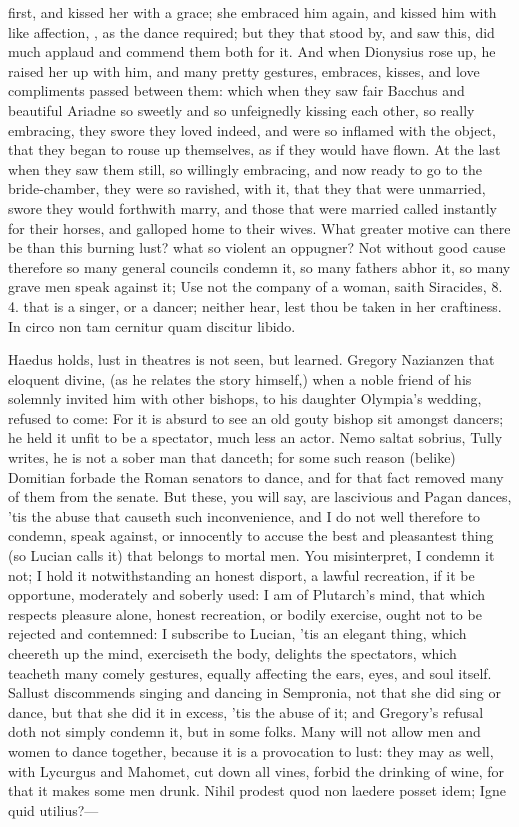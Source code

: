 first, and kissed her with a grace; she embraced him again, and kissed
him with like affection, \etc{}, as the dance required; but they that
stood by, and saw this, did much applaud and commend them both for it.
And when Dionysius rose up, he raised her up with him, and many pretty
gestures, embraces, kisses, and love compliments passed between them:
which when they saw fair Bacchus and beautiful Ariadne so sweetly and
so unfeignedly kissing each other, so really embracing, they swore they
loved indeed, and were so inflamed with the object, that they began to
rouse up themselves, as if they would have flown. At the last when they
saw them still, so willingly embracing, and now ready to go to the
bride-chamber, they were so ravished, with it, that they that were
unmarried, swore they would forthwith marry, and those that were
married called instantly for their horses, and galloped home to their
wives. What greater motive can there be than this burning lust? what so
violent an oppugner? Not without good cause therefore so many general
councils condemn it, so many fathers abhor it, so many grave men speak
against it; Use not the company of a woman, saith Siracides, 8. 4. that
is a singer, or a dancer; neither hear, lest thou be taken in her
craftiness. In circo non tam cernitur quam discitur libido.

Haedus holds, lust in theatres is not seen, but learned. Gregory
Nazianzen that eloquent divine, (as he relates the story
himself,) when a noble friend of his solemnly invited him with other
bishops, to his daughter Olympia's wedding, refused to come: For
it is absurd to see an old gouty bishop sit amongst dancers; he held it
unfit to be a spectator, much less an actor. Nemo saltat sobrius, Tully
writes, he is not a sober man that danceth; for some such reason
(belike) Domitian forbade the Roman senators to dance, and for that
fact removed many of them from the senate. But these, you will say, are
lascivious and Pagan dances, 'tis the abuse that causeth such
inconvenience, and I do not well therefore to condemn, speak against,
or innocently to accuse the best and pleasantest thing (so Lucian
calls it) that belongs to mortal men. You misinterpret, I condemn it
not; I hold it notwithstanding an honest disport, a lawful recreation,
if it be opportune, moderately and soberly used: I am of Plutarch's
mind, that which respects pleasure alone, honest recreation, or
bodily exercise, ought not to be rejected and contemned: I subscribe to
Lucian, 'tis an elegant thing, which cheereth up the mind,
exerciseth the body, delights the spectators, which teacheth many
comely gestures, equally affecting the ears, eyes, and soul itself.
Sallust discommends singing and dancing in Sempronia, not that she did
sing or dance, but that she did it in excess, 'tis the abuse of it; and
Gregory's refusal doth not simply condemn it, but in some folks. Many
will not allow men and women to dance together, because it is a
provocation to lust: they may as well, with Lycurgus and Mahomet, cut
down all vines, forbid the drinking of wine, for that it makes some men
drunk.
Nihil prodest quod non laedere posset idem;
Igne quid utilius?---

